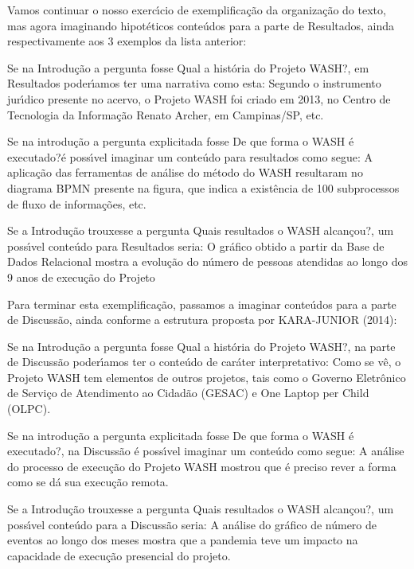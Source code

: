 \documentclass[
12pt,		%
openright,	%
twoside,  %
a4paper,			%
chapter=TITLE,		%
english,			%
french,				%
spanish,			%
brazil				%
]{USPSC-classe/USPSC}
\begin{document}
Vamos continuar o nosso exerc\'{\i}cio de exemplifica\c{c}\~ao da organiza\c{c}\~ao do texto, mas agora imaginando hipot\'eticos conte\'udos para a parte de Resultados, ainda respectivamente aos 3 exemplos da lista anterior:



\begin{alineas}
\item Se na Introdu\c{c}\~ao a pergunta fosse \textquotedbl Qual a hist\'oria do Projeto WASH?\textquotedbl , em Resultados poder\'{\i}amos ter uma narrativa como esta: \textquotedbl Segundo o instrumento jur\'{\i}dico presente no acervo, o Projeto WASH foi criado em 2013, no Centro de Tecnologia da Informa\c{c}\~ao Renato Archer, em Campinas/SP, etc.\textquotedbl 
\item Se na introdu\c{c}\~ao a pergunta explicitada fosse \textquotedbl De que forma o WASH \'e executado?\textquotedbl  \'e poss\'{\i}vel imaginar um conte\'udo para resultados como segue: \textquotedbl A aplica\c{c}\~ao das ferramentas de an\'alise do m\'etodo do WASH resultaram no diagrama BPMN presente na figura, que indica a exist\^encia de 100 subprocessos de fluxo de informa\c{c}\~oes, etc.\textquotedbl 
\item Se a Introdu\c{c}\~ao trouxesse a pergunta \textquotedbl Quais resultados o WASH alcan\c{c}ou?\textquotedbl , um poss\'{\i}vel conte\'udo para Resultados seria: \textquotedbl O gr\'afico obtido a partir da Base de Dados Relacional mostra a evolu\c{c}\~ao do n\'umero de pessoas atendidas ao longo dos 9 anos de execu\c{c}\~ao do Projeto\textquotedbl 
\end{alineas}

Para terminar esta exemplifica\c{c}\~ao, passamos a imaginar conte\'udos para a parte de Discuss\~ao, ainda conforme a estrutura proposta por  KARA-JUNIOR (2014):



\begin{alineas}
\item Se na Introdu\c{c}\~ao a pergunta fosse \textquotedbl Qual a hist\'oria do Projeto WASH?\textquotedbl , na parte de Discuss\~ao poder\'{\i}amos ter o conte\'udo de car\'ater interpretativo: \textquotedbl Como se v\^e, o Projeto WASH tem elementos de outros projetos, tais como o Governo Eletr\^onico de Servi\c{c}o de Atendimento ao Cidad\~ao (GESAC) e One Laptop per Child (OLPC)\textquotedbl .
\item Se na introdu\c{c}\~ao a pergunta explicitada fosse \textquotedbl De que forma o WASH \'e executado?\textquotedbl , na Discuss\~ao \'e poss\'{\i}vel imaginar um conte\'udo como segue: \textquotedbl A an\'alise do processo de execu\c{c}\~ao do Projeto WASH mostrou que \'e preciso rever a forma como se d\'a sua execu\c{c}\~ao remota\textquotedbl .
\item Se a Introdu\c{c}\~ao trouxesse a pergunta \textquotedbl Quais resultados o WASH alcan\c{c}ou?\textquotedbl , um poss\'{\i}vel conte\'udo para a Discuss\~ao seria: \textquotedbl A an\'alise do gr\'afico de n\'umero de eventos ao longo dos meses mostra que a pandemia teve um impacto na capacidade de execu\c{c}\~ao presencial do projeto.\textquotedbl 
\end{alineas}
\end{document}
